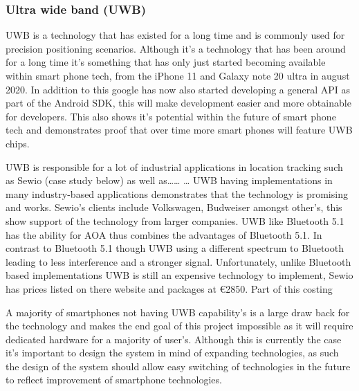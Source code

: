 \subsubsection{Ultra wide band (UWB)}
UWB is a technology that has existed for a long time and is commonly used for precision positioning scenarios. Although it’s a technology that has been around for a long time it’s something that has only just started becoming available within smart phone tech, from the iPhone 11 and Galaxy note 20 ultra in august 2020. In addition to this google has now also started developing a general API as part of the Android SDK, this will make development easier and more obtainable for developers. This also shows it's potential within the future of smart phone tech and demonstrates proof that over time more smart phones will feature UWB chips.

UWB is responsible for a lot of industrial applications in location tracking such as Sewio (case study below) as well as…… … UWB having implementations in many industry-based applications demonstrates that the technology is promising and works. Sewio’s clients include Volkswagen, Budweiser amongst other’s, this show support of the technology from larger companies. 
UWB like Bluetooth 5.1 has the ability for AOA thus combines the advantages of Bluetooth 5.1. In contrast to Bluetooth 5.1 though UWB using a different spectrum to Bluetooth leading to less interference and a stronger signal. Unfortunately, unlike Bluetooth based implementations UWB is still an expensive technology to implement, Sewio has prices listed on there website and packages at €2850. Part of this costing

A majority of smartphones not having UWB capability’s is a large draw back for the technology and makes the end goal of this project impossible as it will require dedicated hardware for a majority of user’s. Although  this is currently the case it’s important to design the system in mind of expanding technologies, as such the design of the system should allow easy switching of technologies in the future to reflect improvement of smartphone technologies.
